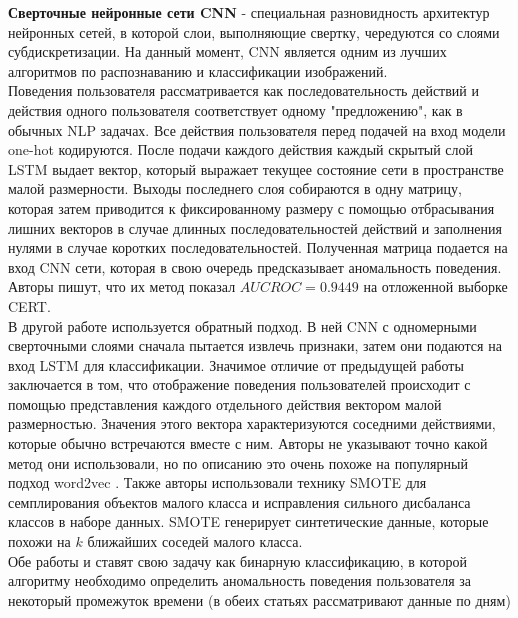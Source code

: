\textbf{Сверточные нейронные сети CNN} - специальная разновидность архитектур нейронных сетей, в которой слои, выполняющие свертку, чередуются со слоями субдискретизации. На данный момент, CNN является одним из лучших алгоритмов по распознаванию и классификации изображений.\\

Поведения пользователя рассматривается как последовательность действий и действия одного пользователя соответствует одному "предложению", как в обычных NLP задачах. Все действия пользователя перед подачей на вход модели one-hot кодируются. После подачи каждого действия каждый скрытый слой LSTM выдает вектор, который выражает текущее состояние сети в пространстве малой размерности. Выходы последнего слоя собираются в одну матрицу, которая затем приводится к фиксированному размеру с помощью отбрасывания лишних векторов в случае длинных последовательностей действий и заполнения нулями в случае коротких последовательностей. Полученная матрица подается на вход CNN сети, которая в свою очередь предсказывает аномальность поведения. Авторы пишут, что их метод показал $AUC ROC=0.9449$ на отложенной выборке CERT.\\

В другой работе \cite{saaudiInsiderThreatsDetection2019} используется обратный подход. В ней CNN с одномерными сверточными слоями сначала пытается извлечь признаки, затем они подаются на вход LSTM для классификации. Значимое отличие от предыдущей работы заключается в том, что отображение поведения пользователей происходит с помощью представления каждого отдельного действия вектором малой размерностью. Значения этого вектора характеризуются соседними действиями, которые обычно встречаются вместе с ним. Авторы не указывают точно какой метод они использовали, но по описанию это очень похоже на популярный подход word2vec \cite{mikolovEfficientEstimationWord2013a}. Также авторы использовали технику SMOTE \cite{chawlaSMOTESyntheticMinority2002} для семплирования объектов малого класса и исправления сильного дисбаланса классов в наборе данных. SMOTE генерирует синтетические данные, которые похожи на $k$ ближайших соседей малого класса.\\

Обе работы \cite{saaudiInsiderThreatsDetection2019} и \cite{yuanInsiderThreatDetection2018b} ставят свою задачу как бинарную классификацию, в которой алгоритму необходимо определить аномальность поведения пользователя за некоторый промежуток времени (в обеих статьях рассматривают данные по дням)

